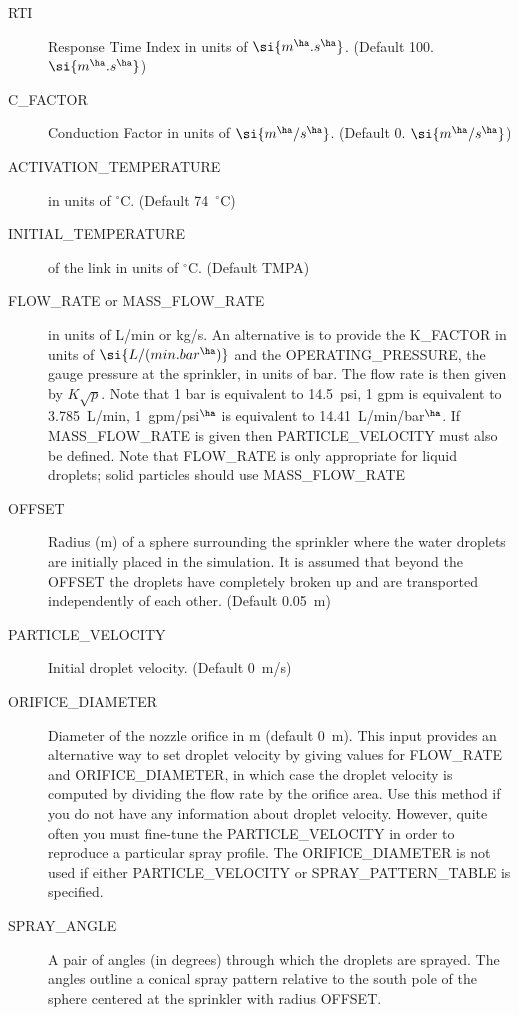 \documentclass[11pt]{book}
\begin{document}
\begin{description}
\item[{\ct RTI}] Response Time Index in units of $\si{m^\ha.s^\ha}$. (Default 100. $\si{m^\ha.s^\ha}$)
\item[{\ct C\_FACTOR}] Conduction Factor in units of $\si{m^\ha/s^\ha}$. (Default 0. $\si{m^\ha/s^\ha}$)
\item[{\ct ACTIVATION\_TEMPERATURE}] in units of $^\circ$C. (Default 74~$^\circ$C)
\item[{\ct INITIAL\_TEMPERATURE}] of the link in units of $^\circ$C. (Default {\ct TMPA})
\item[{\ct FLOW\_RATE} or {\ct MASS\_FLOW\_RATE}] in units of L/min or kg/s.
An alternative is to provide the {\ct K\_FACTOR} in units of $\si{L/(min.bar^{\ha})}$ and the
{\ct OPERATING\_PRESSURE}, the gauge pressure at the sprinkler, in units of bar.
The flow rate is then given by $K \sqrt{p}$. Note that 1 bar is equivalent to
14.5~psi, 1 gpm is equivalent to 3.785~L/min, 1~gpm/psi$^\ha$ is
equivalent to 14.41~L/min/bar$^\ha$.  If {\ct MASS\_FLOW\_RATE} is given then {\ct PARTICLE\_VELOCITY} must also be defined.
Note that {\ct FLOW\_RATE} is only appropriate for liquid droplets; solid particles should use {\ct MASS\_FLOW\_RATE}
\item[{\ct OFFSET}] Radius (m) of a sphere surrounding the
sprinkler where the water droplets are initially placed in the simulation. It is assumed that beyond the {\ct OFFSET} the droplets have completely broken
up and are transported independently of each other. (Default 0.05~m)
\item[{\ct PARTICLE\_VELOCITY}]  Initial droplet velocity. (Default 0~m/s)
\item[{\ct ORIFICE\_DIAMETER}] Diameter of the nozzle orifice in m (default 0~m). This input provides an alternative way to set droplet velocity
by giving values for {\ct FLOW\_RATE} and {\ct ORIFICE\_DIAMETER}, in which case the droplet velocity is computed by dividing the
flow rate by the orifice area. Use this method if you do not have any information about droplet velocity. However, quite often
you must fine-tune the {\ct PARTICLE\_VELOCITY} in order to reproduce a particular spray profile.
The {\ct ORIFICE\_DIAMETER} is not used if either {\ct PARTICLE\_VELOCITY} or {\ct SPRAY\_PATTERN\_TABLE} is specified.
\item[{\ct SPRAY\_ANGLE}] A pair of angles (in degrees) through which the droplets are sprayed.
The angles outline a conical spray pattern relative to the
south pole of the sphere centered at the sprinkler with radius {\ct OFFSET}.

\end{description}
\end{document}
